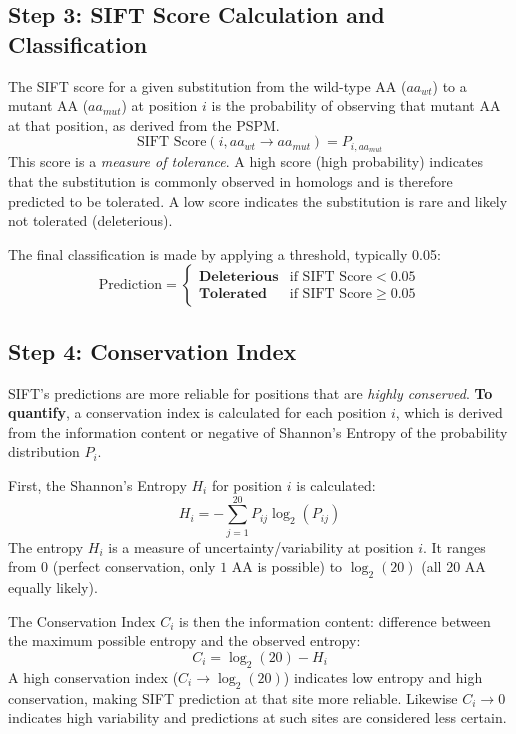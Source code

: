 \documentclass[../main.tex]{subfiles}
\begin{document}
\subsection{Step 3: SIFT Score Calculation and Classification}

The SIFT score for a given substitution from the wild-type AA ($aa_{wt}$) to a mutant AA ($aa_{mut}$) at position $i$ is the probability of observing that mutant AA at that position, as derived from the PSPM.
\begin{equation}
\text{SIFT Score}(i, aa_{wt} \to aa_{mut}) = P_{i, aa_{mut}}
\end{equation}
This score is a \textit{measure of tolerance}. A high score (high probability) indicates that the substitution is commonly observed in homologs and is therefore predicted to be tolerated. A low score indicates the substitution is rare and likely not tolerated (deleterious).

The final classification is made by applying a threshold, typically 0.05:
\begin{equation}
\text{Prediction} =
\begin{cases}
    \textbf{Deleterious} & \text{if SIFT Score} < 0.05 \\
    \textbf{Tolerated} & \text{if SIFT Score} \geq 0.05
\end{cases}
\end{equation}

\subsection{Step 4: Conservation Index}

SIFT's predictions are more reliable for positions that are \textit{highly conserved}. \textbf{To quantify}, a conservation index is calculated for each position $i$, which is derived from the information content or negative of Shannon's Entropy of the probability distribution $P_i$.

First, the Shannon's Entropy $H_i$ for position $i$ is calculated:
\begin{equation}
H_i = - \sum_{j=1}^{20} P_{ij} \log_2(P_{ij})
\end{equation}
The entropy $H_i$ is a measure of uncertainty/variability at position $i$. It ranges from 0 (perfect conservation, only $1$ AA is possible) to $\log_2(20)$ (all 20 AA equally likely).

The Conservation Index $C_i$ is then the information content: difference between the maximum possible entropy and the observed entropy:
\begin{equation}
C_i = \log_2(20) - H_i
\end{equation}
A high conservation index ($C_i \to \log_2(20)$) indicates low entropy and high conservation, making SIFT prediction at that site more reliable. Likewise $C_i \to 0$ indicates high variability and predictions at such sites are considered less certain.
\end{document}
